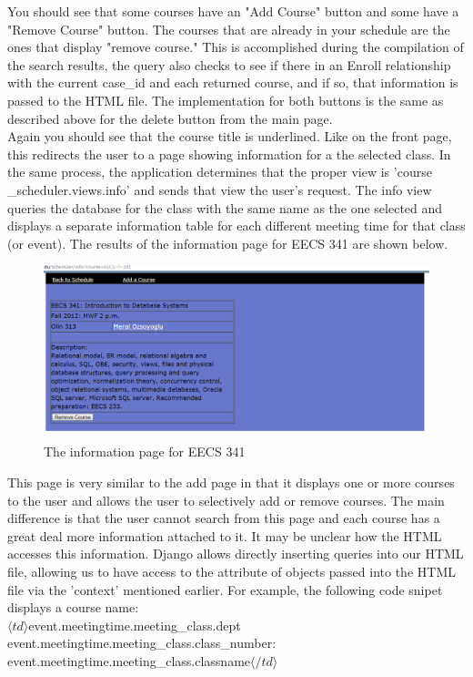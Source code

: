 \documentclass[pdftex,12pt,letter]{article}
\begin{document}
\FloatBarrier
You should see that some courses have an "Add Course" button and some have a "Remove Course" button. The courses that are already in your schedule are the ones that display "remove course." This is accomplished during the compilation of the search results, the query also checks to see if there in an Enroll relationship with the current case\_id and each returned course, and if so, that information is passed to the HTML file. The implementation for both buttons is the same as described above for the delete button from the main page.\\

Again you should see that the course title is underlined. Like on the front page, this redirects the user to a page showing information for a the selected class. In the same process, the application determines that the proper view is 'course \_scheduler.views.info' and sends that view the user's request. The info view queries the database for the class with the same name as the one selected and displays a separate information table for each different meeting time for that class (or event). The results of the information page for EECS 341 are shown below.
\begin{figure}
\includegraphics[width=6in]{databaseInfo.png}
\caption{The information page for EECS 341}
\end{figure}
\FloatBarrier
This page is very similar to the add page in that it displays one or more courses to the user and allows the user to selectively add or remove courses. The main difference is that the user cannot search from this page and each course has a great deal more information attached to it. It may be unclear how the HTML accesses this information. Django allows directly inserting queries into our HTML file, allowing us to have access to the attribute of objects passed into the HTML file via the 'context' mentioned earlier. For example, the following code snipet displays a course name:\\
$\langle td \rangle${{event.meetingtime.meeting\_class.dept}} {{event.meetingtime.meeting\_class.class\_number}}: {{event.meetingtime.meeting\_class.classname}}$\langle/td \rangle$\\
\end{document}
